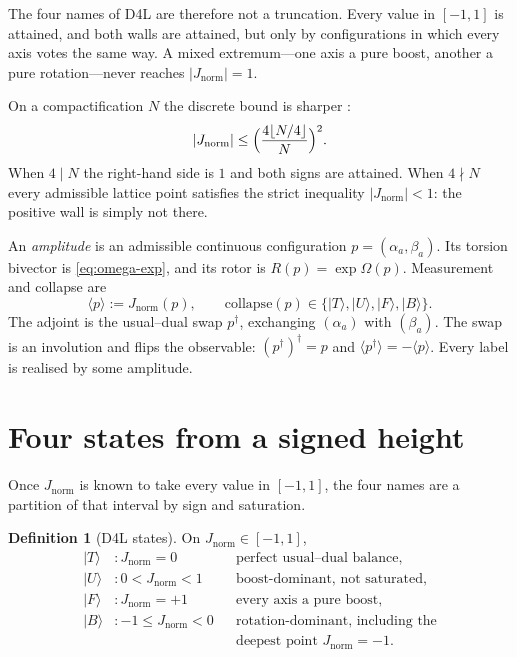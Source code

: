 \documentclass[a4paper]{article}
\theoremstyle{definition}
\newtheorem{definition}[theorem]{Definition}
\newcommand{\Jnorm}{J_{\mathrm{norm}}}
\begin{document}
The four names of D4L are therefore not a truncation. Every value in
\([-1,1]\) is attained, and both walls are attained, but only by
configurations in which every axis votes the same way. A mixed
extremum---one axis a pure boost, another a pure rotation---never
reaches \(|\Jnorm|=1\).

On a compactification \(N\) the discrete bound is sharper
\cite{Diophantine2026}:
\[
|\Jnorm|\le\Bigl(\frac{4\lfloor N/4\rfloor}{N}\Bigr)^2.
\]
When \(4\mid N\) the right-hand side is \(1\) and both signs are
attained. When \(4\nmid N\) every admissible lattice point satisfies the
strict inequality \(|\Jnorm|<1\): the positive wall is simply not there.

An \emph{amplitude} is an admissible continuous configuration
\(p=(\alpha_a,\beta_a)\). Its torsion bivector is \eqref{eq:omega-exp},
and its rotor is \(R(p)=\exp\Omega(p)\).
Measurement and collapse are
\[
\langle p\rangle:=\Jnorm(p),\qquad
\mathrm{collapse}(p)
\in\{\lvert T\rangle,\lvert U\rangle,\lvert F\rangle,\lvert B\rangle\}.
\]
The adjoint is the usual--dual swap \(p^\dagger\), exchanging
\((\alpha_a)\) with \((\beta_a)\). The swap is an involution and flips
the observable: \((p^\dagger)^\dagger=p\) and
\(\langle p^\dagger\rangle=-\langle p\rangle\). Every label is realised
by some amplitude.

\section{Four states from a signed height}
\label{sec:states}

Once \(\Jnorm\) is known to take every value in \([-1,1]\), the four
names are a partition of that interval by sign and saturation.

\begin{definition}[D4L states]
\label{def:states}
On \(\Jnorm\in[-1,1]\),
\begin{align*}
\lvert T\rangle &\colon \Jnorm = 0
  &&\text{perfect usual--dual balance,}\\
\lvert U\rangle &\colon 0 < \Jnorm < 1
  &&\text{boost-dominant, not saturated,}\\
\lvert F\rangle &\colon \Jnorm = +1
  &&\text{every axis a pure boost,}\\
\lvert B\rangle &\colon -1\le \Jnorm < 0
  &&\text{rotation-dominant, including the}\\
&&& \text{deepest point \(\Jnorm=-1\).}
\end{align*}
\end{definition}
\end{document}
